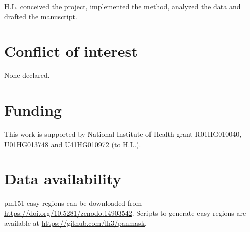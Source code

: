 \documentclass[webpdf,contemporary,large,namedate]{oup-authoring-template}%
\begin{document}
H.L. conceived the project, implemented the method, analyzed the data and drafted the manuscript.

\section*{Conflict of interest}

None declared.

\section*{Funding}

This work is supported by National Institute of Health grant R01HG010040, U01HG013748 and U41HG010972 (to H.L.).

\section*{Data availability}

pm151 easy regions can be downloaded from \url{https://doi.org/10.5281/zenodo.14903542}. Scripts to generate easy regions are available at \url{https://github.com/lh3/panmask}.


{\sffamily\small
}
\end{document}
